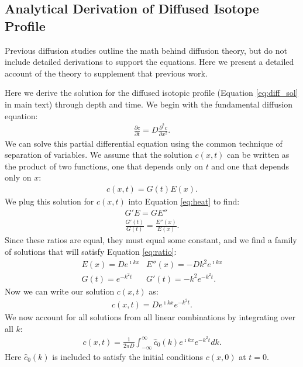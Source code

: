 \documentclass[draft, jgrga]{AGUTeX}
\begin{document}
\begin{article}



\appendix

\section{Analytical Derivation of Diffused Isotope Profile}

Previous diffusion studies \citep{Johnsen2000, Gkinis2014} outline the math behind diffusion theory, but do not include detailed derivations to support the equations. Here we present a detailed account of the theory to supplement that previous work.

Here we derive the solution for the diffused isotopic profile (Equation \ref{eq:diff_sol} in main text) through depth and time. We begin with the fundamental diffusion equation:
\begin{eqnarray}
  \label{eq:heat}
\frac{\partial c}{\partial t}
= D \frac{\partial ^2c}{\partial x^2}.
\end{eqnarray}
We can solve this partial differential equation using the common technique of separation of variables. We assume that the solution $c(x,t)$ can be written as the product of two functions, one that depends only on $t$ and one that depends only on $x$:
\begin{eqnarray}
c(x,t) = G(t)E(x).
\end{eqnarray}
We plug this solution for $c(x,t)$ into Equation \ref{eq:heat} to find:
\begin{eqnarray}
G'E = GE'' \nonumber \\
\frac{G'(t)}{G(t)} = \frac{E''(x)}{E(x)}. \label{eq:ratio}
\end{eqnarray}
Since these ratios are equal, they must equal some constant, and we find a family of solutions that will satisfy Equation \ref{eq:ratio}:
\begin{eqnarray}
E(x) = De^{\imath kx} & E''(x) = -Dk^2e^{\imath kx} \nonumber \\
G(t) = e^{-k^2t} & G'(t) = -k^2 e^{-k^2t}. \nonumber
\end{eqnarray}
Now we can write our solution $c(x,t)$ as:
\begin{eqnarray}
c(x,t) = De^{\imath kx}e^{-k^2t}.
\end{eqnarray}
We now account for all solutions from all linear combinations by integrating over all $k$:
\begin{eqnarray}
  \label{eq:gensolution}
c(x,t) = \frac{1}{2 \pi D}
\int^\infty_{-\infty} \hat{c}_0 (k) e^{\imath kx} e^{-k^2t} dk.
\end{eqnarray}
Here $ \hat{c}_0 (k)$ is included to satisfy the initial conditions $c(x,0)$ at $t=0$.


\end{article}
\end{document}
